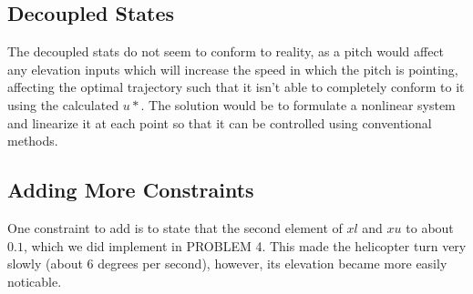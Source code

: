 \subsection{Decoupled States}
The decoupled stats do not seem to conform to reality, as a pitch would affect any elevation inputs which will increase the speed in which the pitch is pointing, affecting the optimal trajectory such that it isn't able to completely conform to it using the calculated $u*$. The solution would be to formulate a nonlinear system and linearize it at each point so that it can be controlled using conventional methods.

\subsection{Adding More Constraints}
One constraint to add is to state that the second element of $xl$ and $xu$ to about $0.1$, which we did implement in PROBLEM 4. This made the helicopter turn very slowly (about 6 degrees per second), however, its elevation became more easily noticable.



